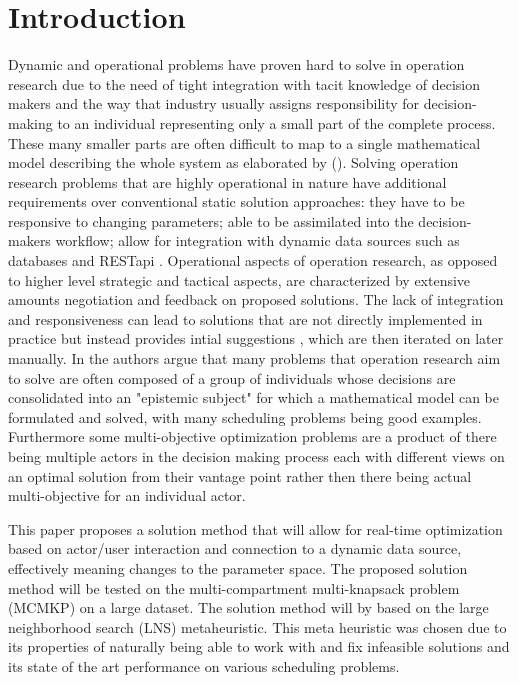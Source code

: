 \documentclass[preprint,12pt,authoryear]{elsarticle}
\begin{document}

\section{Introduction}
\label{sec:1-introduction}

Dynamic and operational problems have proven hard to solve in operation research due to the need of tight integration with tacit knowledge of decision makers and the way that industry usually assigns responsibility for decision-making 
to an individual representing only a small part of the complete process. These many smaller parts are often difficult to map to a single mathematical model describing the whole system as elaborated by (\citep{barthelemy_human_2002}).
Solving operation research problems that are highly operational in nature have additional requirements over conventional static solution approaches: they have to be responsive to changing parameters; 
able to be assimilated into the decision-makers workflow; allow for integration with dynamic data sources such as databases and RESTapi \citep{meignan_review_2015}. 
Operational aspects of operation research, as opposed to higher level strategic and tactical aspects, are characterized by extensive amounts negotiation and feedback on 
proposed solutions. The lack of integration and responsiveness can lead to solutions that are not directly implemented in practice but instead provides intial suggestions \cite{meignan_review_2015}, which are
then iterated on later manually. In \citep{barthelemy_human_2002} the authors argue that many problems that operation research aim to solve are often composed of a group of individuals whose decisions are 
consolidated into an "epistemic subject" for which a mathematical model can be formulated and solved, with many scheduling problems being good examples. Furthermore some multi-objective optimization problems are a product of 
there being multiple actors in the decision making process each with different views on an optimal solution from their vantage point rather then there being actual multi-objective for an individual actor.

This paper proposes a solution method that will allow for real-time optimization based on actor/user interaction and connection to a dynamic 
data source, effectively meaning changes to the parameter space. The proposed solution method will be tested on the multi-compartment multi-knapsack problem (MCMKP) on a large dataset. 
The solution method will by based on the large neighborhood search (LNS) metaheuristic. This meta heuristic was chosen due to its properties of naturally being able to work with and fix 
infeasible solutions and its state of the art performance on various scheduling problems. 
\end{document}
